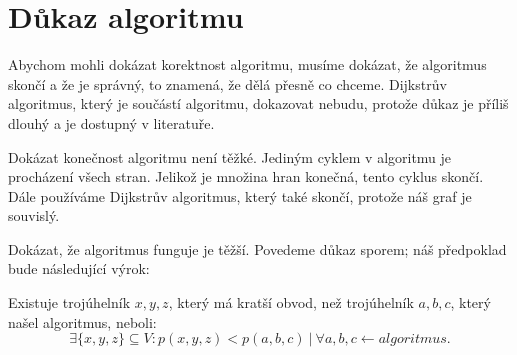 \section{Důkaz algoritmu}
\label{dukaz_algoritmu}

Abychom mohli dokázat korektnost algoritmu, musíme dokázat, že algoritmus skončí a že je správný, to znamená, že dělá přesně co chceme. Dijkstrův algoritmus, který je součástí algoritmu, dokazovat nebudu, protože důkaz je příliš dlouhý a je dostupný v literatuře.

Dokázat konečnost algoritmu není těžké. Jediným cyklem v algoritmu je procházení všech stran. Jelikož je množina hran konečná, tento cyklus skončí.  Dále používáme Dijkstrův algoritmus, který také skončí, protože náš graf je souvislý. 

Dokázat, že algoritmus funguje je těžší. Povedeme důkaz sporem; náš předpoklad bude následující výrok:

\begin{vyrok}[Předpoklad]
Existuje trojúhelník $x, y, z$, který má kratší obvod, než trojúhelník $a, b, c$, který našel algoritmus, neboli:
\begin{equation*}
    \exists \{x, y, z\}\subseteq V: p(x, y, z) < p(a, b, c)~|~\forall a, b, c \leftarrow algoritmus.
\end{equation*}
\end{vyrok}

